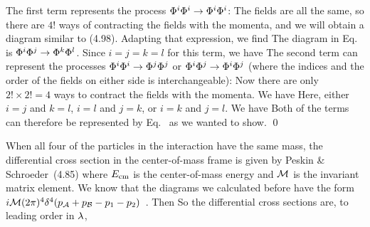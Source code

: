 \documentclass[11pt]{article}
\begin{document}
{	The first term represents the process $\Phi^i \Phi^i \to \Phi^i \Phi^i$:
	The fields are all the same, so there are $4!$ ways of contracting the fields with the momenta, and we will obtain a diagram similar to (4.98).  Adapting that expression, we find
	The diagram in Eq.~ is $\Phi^i \Phi^j \to \Phi^k \Phi^l$.  Since $i = j = k = l$ for this term, we have
	The second term can represent the processes $\Phi^i \Phi^i \to \Phi^j \Phi^j$ or $\Phi^i \Phi^j \to \Phi^i \Phi^j$ (where the indices and the order of the fields on either side is interchangeable):
	Now there are only $2! \times 2! = 4$ ways to contract the fields with the momenta.  We have
	Here, either $i = j$ and $k = l$, $i = l$ and $j = k$, or $i = k$ and $j = l$.  We have
	Both of the terms can therefore be represented by Eq.~ as we wanted to show. \qed
	
	When all four of the particles in the interaction have the same mass, the differential cross section in the center-of-mass frame is given by Peskin \& Schroeder~(4.85)
	where $E_{\text{cm}}$ is the center-of-mass energy and $\mathcal{M}$ is the invariant matrix element.  We know that the diagrams we calculated before have the form $i \mathcal{M} (2\pi)^4 \delta^4(p_{\mathcal{A}} + p_{\mathcal{B}} - p_1 - p_2)$~\cite[p.~112]{Peskin}.  Then
	So the differential cross sections are, to leading order in $\lambda$,
	\vfix
}
\end{document}
